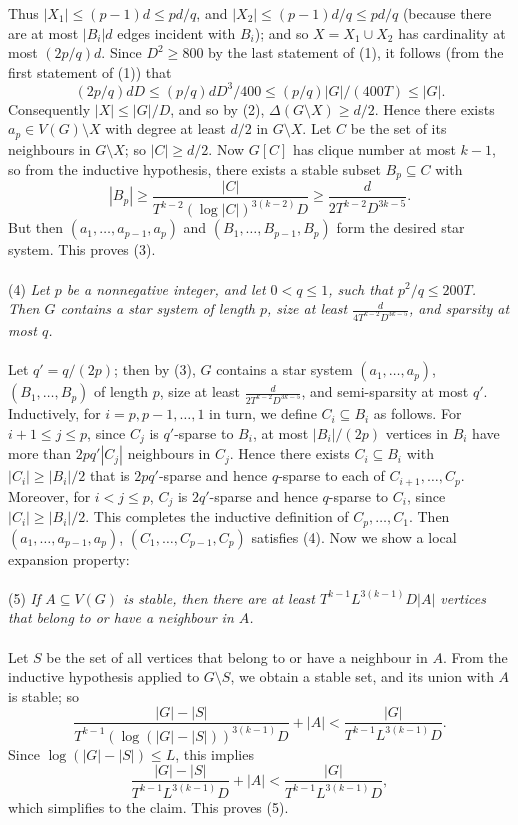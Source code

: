 \documentclass[titlepage,11pt]{article}
\def\LL{,\ldots,}
\begin{document}
Thus $|X_1|\le (p-1)d\le pd/q$, and $|X_2|\le (p-1)d/q\le pd/q$ (because there are at most $|B_i|d$ edges incident with
$B_i$); and so $X=X_1\cup X_2$ has cardinality at most 
$(2p/q)d$. Since $D^2\ge 800 $ by the last statement of (1), it follows (from the first statement of (1)) that  
$$(2p/q)dD \le  (p/q)dD^3/400\le   (p/q)|G|/(400T)  \le |G|.$$
Consequently $|X|\le |G|/D$, and so by (2), $\Delta(G\setminus X)\ge d/2$. Hence there exists $a_p\in V(G)\setminus X$
with degree at least $d/2$ in $G\setminus X$. Let $C$ be the set of its neighbours in $G\setminus X$; so $|C|\ge d/2$. 
Now $G[C]$ has clique number at most $k-1$, so from the inductive hypothesis, there exists a stable subset
$B_p\subseteq C$ with 
$$|B_p|\ge \frac{|C|}{T^{k-2}(\log |C|)^{3(k-2)}D}\ge \frac{d}{2T^{k-2}D^{3k-5}}.$$
But then $(a_1\LL a_{p-1}, a_p)$ and
$(B_1\LL B_{p-1}, B_p)$ form the desired star system.
This proves (3).
\\
\\
(4) {\em Let $p$ be a nonnegative integer, and let $0<q\le 1$, such that $p^2/q\le 200T$. 
Then $G$ contains a star system of length $p$, 
size at least $\frac{d}{4T^{k-2}D^{3k-5}}$, and sparsity at most $q$.}
\\
\\
Let $q'=q/(2p)$; then by (3), $G$ contains a star system $(a_1\LL a_p)$,
$(B_1\LL B_p)$ of length $p$, 
size at least $\frac{d}{2T^{k-2}D^{3k-5}}$, and semi-sparsity at most $q'$. 
Inductively, for $i = p, p-1\LL 1$ in turn, we define $C_i\subseteq B_i$ as follows. For $i+1\le j\le p$, since 
$C_j$ is $q'$-sparse to $B_i$, at most $|B_i|/(2p)$ vertices in $B_i$ have more than $2pq'|C_j|$ neighbours in $C_j$. Hence
there exists $C_i\subseteq B_i$ with $|C_i|\ge |B_i|/2$ that is $2pq'$-sparse and hence $q$-sparse to each of $C_{i+1}\LL C_p$. Moreover, for $i<j\le p$,
$C_j$ is $2q'$-sparse and hence $q$-sparse to $C_i$, since $|C_i|\ge |B_i|/2$. This completes the inductive definition of $C_p\LL C_1$. 
Then $(a_1\LL a_{p-1}, a_p)$,
$(C_1\LL C_{p-1}, C_p)$ satisfies (4).
\bigskip
Now we show a local expansion property:
\\
\\
(5) {\em If $A\subseteq V(G)$ is stable, then there are at least $T^{k-1}L^{3(k-1)}D|A|$ vertices that belong to or have a neighbour in $A$.}
\\
\\
Let $S$ be the set of all vertices that belong to or have a neighbour in $A$. From the inductive hypothesis applied to $G\setminus S$,
we obtain a stable set, and its union with $A$ is stable; so
$$\frac{|G|-|S|}{T^{k-1}(\log(|G|-|S|))^{3(k-1)}D}+|A|<\frac{|G|}{T^{k-1}L^{3(k-1)}D}.$$
Since $\log(|G|-|S|)\le L$, this implies
$$\frac{|G|-|S|}{T^{k-1}L^{3(k-1)}D}+|A|<\frac{|G|}{T^{k-1}L^{3(k-1)}D},$$
which simplifies to the claim. This proves (5).
\end{document}
